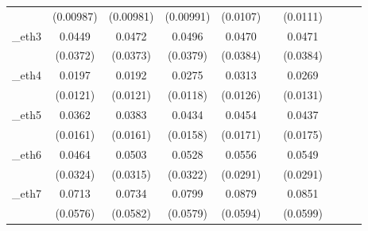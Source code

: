 \begin{table}[htbp]
\begin{tabular}{l*{9}{c}}
            &   (0.00987)         &   (0.00981)         &   (0.00991)         &    (0.0107)         &                     &    (0.0111)         &                     &                     &                     \\
[1em]
\_eth3       &      0.0449         &      0.0472         &      0.0496         &      0.0470         &                     &      0.0471         &                     &                     &                     \\
            &    (0.0372)         &    (0.0373)         &    (0.0379)         &    (0.0384)         &                     &    (0.0384)         &                     &                     &                     \\
[1em]
\_eth4       &      0.0197         &      0.0192         &      0.0275\sym{**} &      0.0313\sym{**} &                     &      0.0269\sym{**} &                     &                     &                     \\
            &    (0.0121)         &    (0.0121)         &    (0.0118)         &    (0.0126)         &                     &    (0.0131)         &                     &                     &                     \\
[1em]
\_eth5       &      0.0362\sym{**} &      0.0383\sym{**} &      0.0434\sym{***}&      0.0454\sym{***}&                     &      0.0437\sym{**} &                     &                     &                     \\
            &    (0.0161)         &    (0.0161)         &    (0.0158)         &    (0.0171)         &                     &    (0.0175)         &                     &                     &                     \\
[1em]
\_eth6       &      0.0464         &      0.0503         &      0.0528         &      0.0556\sym{*}  &                     &      0.0549\sym{*}  &                     &                     &                     \\
            &    (0.0324)         &    (0.0315)         &    (0.0322)         &    (0.0291)         &                     &    (0.0291)         &                     &                     &                     \\
[1em]
\_eth7       &      0.0713         &      0.0734         &      0.0799         &      0.0879         &                     &      0.0851         &                     &                     &                     \\
            &    (0.0576)         &    (0.0582)         &    (0.0579)         &    (0.0594)         &                     &    (0.0599)         &                     &                     &                     \\

\end{tabular}
\end{table}
